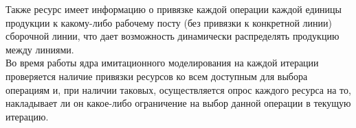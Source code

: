 Также ресурс имеет информацию о привязке каждой операции каждой единицы продукции к какому-либо рабочему посту (без привязки к конкретной линии) сборочной линии, что дает возможность динамически распределять продукцию между линиями.\\
\indent Во время работы ядра имитационного моделирования на каждой итерации проверяется наличие привязки ресурсов ко всем доступным для выбора операциям и, при наличии таковых, осуществляется опрос каждого ресурса на то, накладывает ли он какое-либо ограничение на выбор данной операции в текущую итерацию.

\indent %
